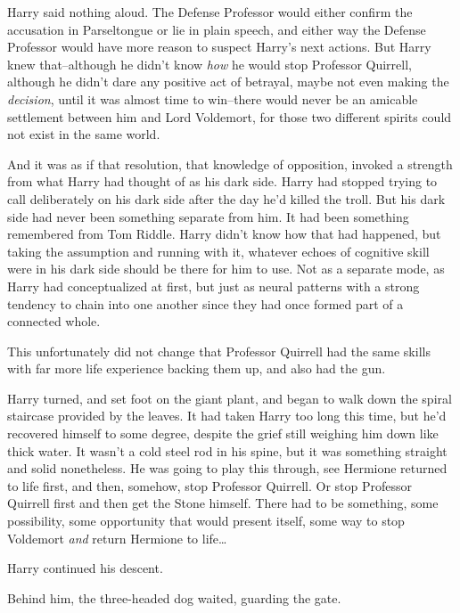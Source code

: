 Harry said nothing aloud. The Defense Professor would either confirm the accusation in Parseltongue or lie in plain speech, and either way the Defense Professor would have more reason to suspect Harry's next actions. But Harry knew that\---although he didn't know \emph{how} he would stop Professor Quirrell, although he didn't dare any positive act of betrayal, maybe not even making the \emph{decision}, until it was almost time to win\---there would never be an amicable settlement between him and Lord Voldemort, for those two different spirits could not exist in the same world.

And it was as if that resolution, that knowledge of opposition, invoked a strength from what Harry had thought of as his dark side. Harry had stopped trying to call deliberately on his dark side after the day he'd killed the troll. But his dark side had never been something separate from him. It had been something remembered from Tom Riddle. Harry didn't know how that had happened, but taking the assumption and running with it, whatever echoes of cognitive skill were in his dark side should be there for him to use. Not as a separate mode, as Harry had conceptualized at first, but just as neural patterns with a strong tendency to chain into one another since they had once formed part of a connected whole.

This unfortunately did not change that Professor Quirrell had the same skills with far more life experience backing them up, and also had the gun.

Harry turned, and set foot on the giant plant, and began to walk down the spiral staircase provided by the leaves. It had taken Harry too long this time, but he'd recovered himself to some degree, despite the grief still weighing him down like thick water. It wasn't a cold steel rod in his spine, but it was something straight and solid nonetheless. He was going to play this through, see Hermione returned to life first, and then, somehow, stop Professor Quirrell. Or stop Professor Quirrell first and then get the Stone himself. There had to be something, some possibility, some opportunity that would present itself, some way to stop Voldemort \emph{and} return Hermione to life{\ldots}

Harry continued his descent.

Behind him, the three-headed dog waited, guarding the gate.

